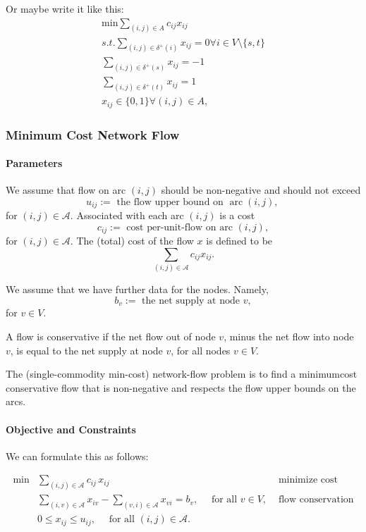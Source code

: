 Or maybe write it like this:
\begin{align}
\text{min} \sum_{(i, j) \in A} c_{i j} x_{i j} \\
s.t. 
\sum_{(i, j) \in \delta^{+}(i)} x_{i j} = 0 \forall i \in V\setminus\{s,t\} \\
\sum_{(i, j) \in \delta^{+}(s)} x_{i j} = -1 \\
\sum_{(i, j) \in \delta^{+}(t)} x_{i j} = 1 \\
x_{i j} \in\{0,1\} \forall(i, j) \in A, 
\end{align}

\subsubsection{Minimum Cost Network Flow}
\paragraph{Parameters}

We assume that flow on arc $(i,j)$ should be non-negative and should not exceed
$$
u_{ij}:=\text { the flow upper bound on } \operatorname{arc} (i,j) \text {, }
$$
for $(i,j) \in \mathcal{A}$. Associated with each arc $(i,j)$ is a cost
$$
c_{ij}:=\text { cost per-unit-flow on arc } (i,j),
$$
for $(i,j) \in \mathcal{A}$. The (total) cost of the flow $x$ is defined to be
$$
\sum_{(i,j) \in \mathcal{A}} c_{ij} x_{ij} .
$$

We assume that we have further data for the nodes. Namely,
$$
b_{v}:=\text { the net supply at node } v,
$$
for $v \in V$. 

A flow is conservative if the net flow out of node $v$, minus the net flow into node $v$, is equal to the net supply at node $v$, for all nodes $v \in V$.

The (single-commodity min-cost) network-flow problem is to find a minimumcost conservative flow that is non-negative and respects the flow upper bounds on the arcs. 





\paragraph{Objective and Constraints}
We can formulate this as follows:
\begin{tcolorbox}
$$
\begin{aligned}
\min & \sum_{(i,j) \in \mathcal{A}} c_{ij}\, x_{ij} & \text{ minimize cost}\\
& \sum_{(i,v) \in \mathcal{A}} x_{iv}-\sum_{(v,i)  \in \mathcal{A} } x_{vi}=b_{v}, \quad \text{ for all }  v \in V,  & \text{ flow conservation}\\
& 0 \leq x_{ij} \leq u_{ij}, \quad \text{ for all }  (i,j) \in \mathcal{A} .
\end{aligned}
$$
\end{tcolorbox}

